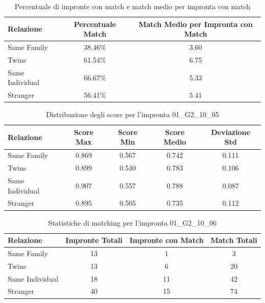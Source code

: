 \begin{table}[htbp]
\centering
\caption{Percentuale di impronte con match e match medio per impronta con match}
\label{tab:match_percentage_01_G2_10_05}
\begin{tabular}{|l|c|c|}
\hline
\textbf{Relazione} & \textbf{Percentuale Match} & \textbf{Match Medio per Impronta con Match} \\
\hline
Same Family & 38.46\% & 3.60 \\
\hline
Twins & 61.54\% & 6.75 \\
\hline
Same Individual & 66.67\% & 5.33 \\
\hline
Stranger & 56.41\% & 5.41 \\
\hline
\end{tabular}
\end{table}


\begin{table}[htbp]
\centering
\caption{Distribuzione degli score per l'impronta 01\_G2\_10\_05}
\label{tab:scores_01_G2_10_05}
\begin{tabular}{|l|c|c|c|c|}
\hline
\textbf{Relazione} & \textbf{Score Max} & \textbf{Score Min} & \textbf{Score Medio} & \textbf{Deviazione Std} \\
\hline
Same Family & 0.869 & 0.567 & 0.742 & 0.111 \\
\hline
Twins & 0.899 & 0.540 & 0.783 & 0.106 \\
\hline
Same Individual & 0.907 & 0.557 & 0.788 & 0.087 \\
\hline
Stranger & 0.895 & 0.505 & 0.735 & 0.112 \\
\hline
\end{tabular}
\end{table}


\begin{table}[htbp]
\centering
\caption{Statistiche di matching per l'impronta 01\_G2\_10\_06}
\label{tab:results_01_G2_10_06}
\begin{tabular}{|l|c|c|c|}
\hline
\textbf{Relazione} & \textbf{Impronte Totali} & \textbf{Impronte con Match} & \textbf{Match Totali} \\
\hline
Same Family & 13 & 1 & 3 \\
\hline
Twins & 13 & 6 & 20 \\
\hline
Same Individual & 18 & 11 & 42 \\
\hline
Stranger & 40 & 15 & 74 \\
\hline
\end{tabular}
\end{table}


